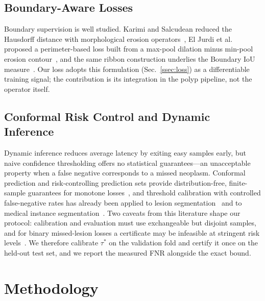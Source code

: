 \documentclass[journal]{IEEEtran}
\begin{document}
\subsection{Boundary-Aware Losses}
Boundary supervision is well studied. Karimi and Salcudean reduced the Hausdorff distance with morphological erosion operators~\cite{karimi2019hd}, El Jurdi et al. proposed a perimeter-based loss built from a max-pool dilation minus min-pool erosion contour~\cite{eljurdi2021perimeter}, and the same ribbon construction underlies the Boundary IoU measure~\cite{karimi2022boundaryiou}. Our loss adopts this formulation (Sec.~\ref{ssec:loss}) as a differentiable training signal; the contribution is its integration in the polyp pipeline, not the operator itself.

\subsection{Conformal Risk Control and Dynamic Inference}
Dynamic inference reduces average latency by exiting easy samples early, but naive confidence thresholding offers no statistical guarantees---an unacceptable property when a false negative corresponds to a missed neoplasm. Conformal prediction and risk-controlling prediction sets provide distribution-free, finite-sample guarantees for monotone losses~\cite{bates2021distribution,angelopoulos2022crc}, and threshold calibration with controlled false-negative rates has already been applied to lesion segmentation~\cite{cls2024} and to medical instance segmentation~\cite{dai2025crcfdr}. Two caveats from this literature shape our protocol: calibration and evaluation must use exchangeable but disjoint samples, and for binary missed-lesion losses a certificate may be infeasible at stringent risk levels~\cite{zheng2026crc}. We therefore calibrate $\tau^{*}$ on the validation fold and certify it once on the held-out test set, and we report the measured FNR alongside the exact bound.

\section{Methodology}
\end{document}
